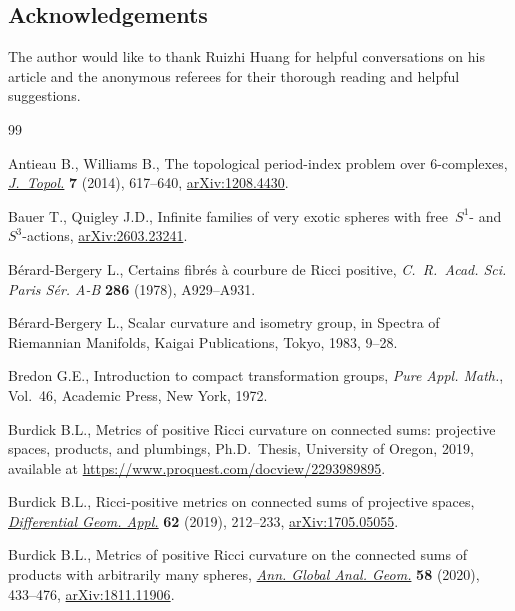 \documentclass[pdftex]{sigma}
\numberwithin{equation}{section}
\theoremstyle{definition}
\numberwithin{table}{section}
\begin{document}
\subsection*{Acknowledgements}
	The author would like to thank Ruizhi Huang for helpful conversations on his article \cite{Hu25} and the anonymous referees for their thorough reading and helpful suggestions.


\begin{thebibliography}{99}
\footnotesize\itemsep=0pt

Antieau B., Williams B., The topological period-index problem over 6-complexes,
  \href{https://doi.org/10.1112/jtopol/jtt042}{\textit{J.~Topol.}} \textbf{7}
  (2014), 617--640, \href{https://arxiv.org/abs/1208.4430}{arXiv:1208.4430}.

Bauer T., Quigley J.D., Infinite families of very exotic spheres with
  free~${S}^1$- and~${S}^3$-actions,
  \href{https://arxiv.org/abs/2603.23241}{arXiv:2603.23241}.

B\'erard-Bergery L., Certains fibr\'es \`a courbure de {R}icci positive,
  \textit{C.~R.~Acad. Sci. Paris S\'er. A-B} \textbf{286} (1978), A929--A931.

B\'erard-Bergery L., Scalar curvature and isometry group, in Spectra of
  Riemannian Manifolds, Kaigai Publications, Tokyo, 1983, 9--28.

Bredon G.E., Introduction to compact transformation groups, \textit{Pure Appl.
  Math.}, Vol.~46, Academic Press, New York, 1972.

Burdick B.L., Metrics of positive {R}icci curvature on connected sums:
  projective spaces, products, and plumbings, Ph.D.~Thesis, {U}niversity of
  Oregon, 2019, available at \url{https://www.proquest.com/docview/2293989895}.

Burdick B.L., Ricci-positive metrics on connected sums of projective spaces,
  \href{https://doi.org/10.1016/j.difgeo.2018.11.005}{\textit{Differential
  Geom. Appl.}} \textbf{62} (2019), 212--233,
  \href{https://arxiv.org/abs/1705.05055}{arXiv:1705.05055}.

Burdick B.L., Metrics of positive {R}icci curvature on the connected sums of
  products with arbitrarily many spheres,
  \href{https://doi.org/10.1007/s10455-020-09732-7}{\textit{Ann. Global Anal.
  Geom.}} \textbf{58} (2020), 433--476,
  \href{https://arxiv.org/abs/1811.11906}{arXiv:1811.11906}.


\end{thebibliography}
\end{document}
